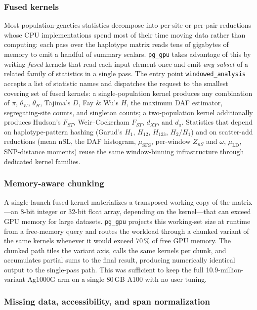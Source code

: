 \documentclass[12pt]{article}
\newcommand{\pggpu}{\texttt{pg\_gpu}\xspace}
\begin{document}
\subsubsection*{Fused kernels}

Most population-genetics statistics decompose into per-site or per-pair
reductions whose CPU implementations spend most of their time moving
data rather than computing: each pass over the haplotype matrix reads
tens of gigabytes of memory to emit a handful of summary scalars.
\pggpu takes advantage of this by writing \emph{fused} kernels that
read each input element once and emit \emph{any subset} of a related
family of statistics in a single pass. The entry point \texttt{windowed\_analysis}
accepts a list of statistic names and dispatches the request to the
smallest covering set of fused kernels: a single-population kernel
produces any combination of $\pi$, $\theta_W$, $\theta_H$, Tajima's
$D$, Fay \& Wu's $H$, the maximum DAF estimator, segregating-site
counts, and singleton counts; a two-population kernel additionally
produces Hudson's $F_{ST}$, Weir--Cockerham $F_{ST}$, $d_{XY}$, and
$d_a$. Statistics that depend on haplotype-pattern hashing (Garud's
$H_1$, $H_{12}$, $H_{123}$, $H_2/H_1$) and on scatter-add reductions
(mean nSL, the DAF histogram, $\mu_{\mathrm{SFS}}$, per-window $Z_{nS}$
and $\omega$, $\mu_{\mathrm{LD}}$, SNP-distance moments) reuse the same
window-binning infrastructure through dedicated kernel families.

\subsubsection*{Memory-aware chunking}

A single-launch fused kernel materializes a transposed working copy of
the matrix---an 8-bit integer or 32-bit float array, depending on the
kernel---that can exceed GPU memory for large datasets. \pggpu projects
this working-set size at runtime from a free-memory query and routes
the workload through a chunked variant of the same kernels whenever it
would exceed 70\,\% of free GPU memory. The chunked path tiles the
variant axis, calls the same kernels per chunk, and accumulates partial
sums to the final result, producing numerically identical output to the
single-pass path. This was sufficient to keep the full
10.9-million-variant Ag1000G arm on a single 80\,GB A100 with no user
tuning.

\subsubsection*{Missing data, accessibility, and span normalization}
\end{document}
